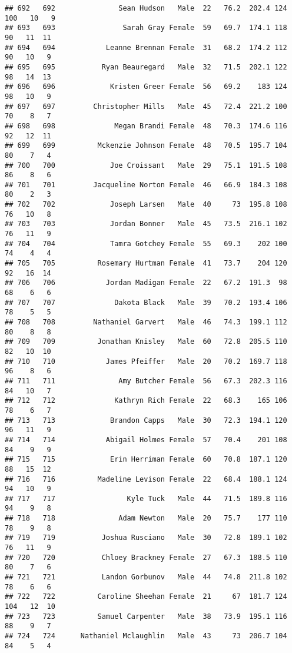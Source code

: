 \documentclass[
]{article}
\begin{document}
\begin{verbatim}
## 692   692               Sean Hudson   Male  22   76.2  202.4 124 100   10   9
## 693   693                Sarah Gray Female  59   69.7  174.1 118  90   11  11
## 694   694            Leanne Brennan Female  31   68.2  174.2 112  90   10   9
## 695   695           Ryan Beauregard   Male  32   71.5  202.1 122  98   14  13
## 696   696             Kristen Greer Female  56   69.2    183 124  98   10   9
## 697   697         Christopher Mills   Male  45   72.4  221.2 100  70    8   7
## 698   698              Megan Brandi Female  48   70.3  174.6 116  92   12  11
## 699   699          Mckenzie Johnson Female  48   70.5  195.7 104  80    7   4
## 700   700             Joe Croissant   Male  29   75.1  191.5 108  86    8   6
## 701   701         Jacqueline Norton Female  46   66.9  184.3 108  80    2   3
## 702   702             Joseph Larsen   Male  40     73  195.8 108  76   10   8
## 703   703             Jordan Bonner   Male  45   73.5  216.1 102  76   11   9
## 704   704             Tamra Gotchey Female  55   69.3    202 100  74    4   4
## 705   705          Rosemary Hurtman Female  41   73.7    204 120  92   16  14
## 706   706            Jordan Madigan Female  22   67.2  191.3  98  68    6   6
## 707   707              Dakota Black   Male  39   70.2  193.4 106  78    5   5
## 708   708         Nathaniel Garvert   Male  46   74.3  199.1 112  80    8   8
## 709   709          Jonathan Knisley   Male  60   72.8  205.5 110  82   10  10
## 710   710            James Pfeiffer   Male  20   70.2  169.7 118  96    8   6
## 711   711               Amy Butcher Female  56   67.3  202.3 116  84   10   7
## 712   712              Kathryn Rich Female  22   68.3    165 106  78    6   7
## 713   713             Brandon Capps   Male  30   72.3  194.1 120  96   11   9
## 714   714            Abigail Holmes Female  57   70.4    201 108  84    9   9
## 715   715             Erin Herriman Female  60   70.8  187.1 120  88   15  12
## 716   716          Madeline Levison Female  22   68.4  188.1 124  94   10   9
## 717   717                 Kyle Tuck   Male  44   71.5  189.8 116  94    9   8
## 718   718               Adam Newton   Male  20   75.7    177 110  78    9   8
## 719   719           Joshua Rusciano   Male  30   72.8  189.1 102  76   11   9
## 720   720           Chloey Brackney Female  27   67.3  188.5 110  80    7   6
## 721   721           Landon Gorbunov   Male  44   74.8  211.8 102  78    6   6
## 722   722          Caroline Sheehan Female  21     67  181.7 124 104   12  10
## 723   723          Samuel Carpenter   Male  38   73.9  195.1 116  88    9   7
## 724   724      Nathaniel Mclaughlin   Male  43     73  206.7 104  84    5   4

\end{verbatim}
\end{document}
